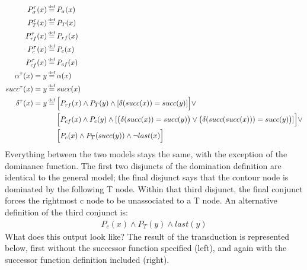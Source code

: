 \documentclass{article}
\newcommand\myeq{\mathrel{\stackrel{\makebox[0pt]{\mbox{\normalfont\tiny def}}}{=}}}
\begin{document}
\begin{equation}
\begin{aligned}
P^{\tau}_{\sigma}(x)&\myeq P_{\sigma}(x) \\
P^{\tau}_{T}(x)&\myeq P_{T}(x) \\
P^{\tau}_{rf}(x)&\myeq P_{rf}(x) \\
P^{\tau}_{c}(x)&\myeq P_{c}(x) \\
P^{\tau}_{cf}(x)&\myeq P_{cf}(x) \\
\alpha^{\tau}(x)=y&\myeq\alpha(x) \\
succ^{\tau}(x)=y&\myeq succ(x) \\
\delta^{\tau}(x)=y&\myeq\Big[P_{rf}(x)\land P_{T}(y)\land[\delta(succ(x)) = succ(y)]\Big]\lor \\
&\quad\,\,\Big[P_{cf}(x)\land P_{c}(y)\land[\big(\delta(succ(x))=succ(y)\big)\lor\big(\delta(succ(succ(x)))=succ(y)\big)]\Big]\lor \\
&\quad\,\,\Big[P_{c}(x)\land P_{T}(succ(y))\land \neg last(x)\Big]
\end{aligned}
\end{equation}
Everything between the two models stays the same, with the exception of the dominance function. The first two disjuncts of the domination definition are identical to the general model; the final disjunct says that the contour node is dominated by the following T node. Within that third disjunct, the final conjunct forces the rightmost c node to be unassociated to a T node. An alternative definition of the third conjunct is:
\begin{equation} \label{domdef2}
\begin{aligned}
P_{c}(x)\land P_{T}(y)\land last(y)
\end{aligned}
\end{equation}
What does this output look like? The result of the transduction is represented below, first without the successor function specified (left), and again with the successor function definition included (right).
\end{document}
